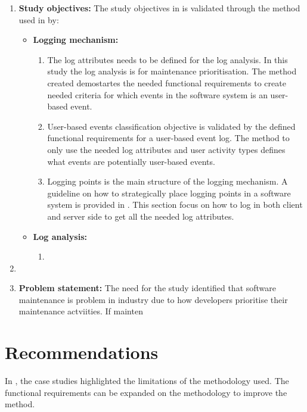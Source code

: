 \begin{enumerate}[label=\textbf{\Roman*.}]
	\item \textbf{Study objectives:} The study objectives in  is validated through the method used in  by:
		\begin{itemize}
			\item \textbf{Logging mechanism:}
			  \begin{enumerate}
				\item The log attributes needs to be defined for the log analysis. In this study the log analysis is for maintenance prioritisation. The method created demostartes the needed functional requirements to create needed criteria for which events in the software system is an user-based event.
				\item User-based events classification objective is validated by the defined functional requirements for a user-based event log. The method to only use the needed log attributes and user activity types defines what events are potentially user-based events.
				\item Logging points is the main structure of the logging mechanism. A guideline on how to strategically place logging points in a software system is provided in . This section focus on how to log in both client and server side to get all the needed log attributes.
			  \end{enumerate}

			\item \textbf{Log analysis:}
			 \begin{enumerate}
				\item 
			 \end{enumerate}
		\end{itemize}

	\item
	\item \textbf{Problem statement:} The need for the study identified that software maintenance is problem in industry due to how developers prioritise their maintenance actviities. If mainten
\end{enumerate}

\section{Recommendations}
In , the case studies highlighted the limitations of the methodology used. The functional requirements can be expanded on the methodology to improve the method.

